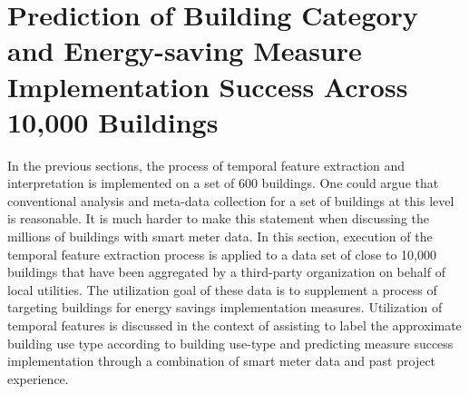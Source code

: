 \section{Prediction of Building Category and Energy-saving Measure Implementation Success Across 10,000 Buildings}
\label{sec:scalability}

In the previous sections, the process of temporal feature extraction and interpretation is implemented on a set of 600 buildings. One could argue that conventional analysis and meta-data collection for a set of buildings at this level is reasonable. It is much harder to make this statement when discussing the millions of buildings with smart meter data. In this section, execution of the temporal feature extraction process is applied to a data set of close to 10,000 buildings that have been aggregated by a third-party organization on behalf of local utilities. The utilization goal of these data is to supplement a process of targeting buildings for energy savings implementation measures. Utilization of temporal features is discussed in the context of assisting to label the approximate building use type according to building use-type and predicting measure success implementation through a combination of smart meter data and past project experience.


